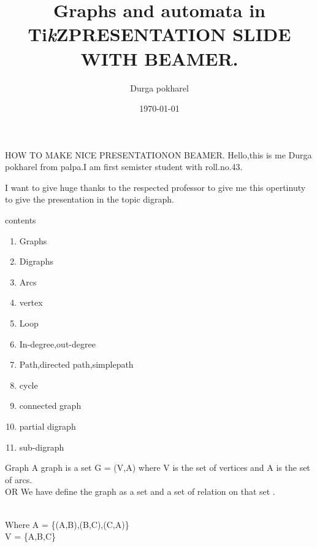 \documentclass[12pt]{beamer}
\title{Graphs and automata in Ti\textit{k}Z}
\title{PRESENTATION SLIDE WITH BEAMER.}
\author{\tiny Durga pokharel}
\institute{Central Department of mathematics}
\date{\today}
\begin{document}
\begin{frame}
\maketitle

\end{frame}
\begin{frame}{ HOW TO MAKE NICE PRESENTATIONON BEAMER.}
Hello,this is me Durga pokharel from palpa.I am first semister student with roll.no.43.

I want to give huge thanks to the respected professor to give me this opertinuty to give the presentation in the topic digraph.
\end{frame}
\begin{frame}[t]{contents}
  
 \begin{enumerate}
    \item  Graphs
    \item  Digraphs
    \item Arcs
    \item vertex
    \item Loop
    \item In-degree,out-degree
    \item Path,directed path,simplepath
    \item cycle
    \item connected graph
    \item partial digraph
    \item sub-digraph
 \end{enumerate}


\end{frame}


  

\begin{frame}[t]{Graph}
A graph is a set G = (V,A) where V is the set of vertices and A is the set of arcs.\\
     OR
We have define the graph as a set and a set of relation on that set .
\\
Where A = \{(A,B),(B,C),(C,A)\}\\
      V = \{A,B,C\}

\end{frame}
\end{document}
